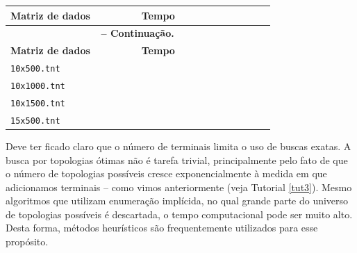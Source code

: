 \begin{refsection}
\begin{center}
\begin{longtable}{lcccccc}
\hline\hline \textbf{Matriz de dados} & \textbf{Tempo}\\
\endfirsthead

\multicolumn{6}{c}{{\bfseries \tablename\ \thetable{} -- Continuação.}}\\
\hline\hline \textbf{Matriz de dados} & \textbf{Tempo}\\
\endhead
\hline \hline
\endlastfoot
\hline
\texttt{10x500.tnt} & ~~~~~~~~~~~~~~~~~~~~~~~~\\
\texttt{10x1000.tnt} & ~~~~~~~~~~~~~~~~~~~~~~~~\\
\texttt{10x1500.tnt} & ~~~~~~~~~~~~~~~~~~~~~~~~\\
\texttt{15x500.tnt} & ~~~~~~~~~~~~~~~~~~~~~~~~\\

\end{longtable}
\end{center}



Deve ter ficado claro que o número de terminais limita o uso de buscas exatas. A busca por topologias ótimas não é tarefa trivial, principalmente pelo fato de que o número de topologias possíveis cresce exponencialmente à medida em que adicionamos terminais -- como vimos anteriormente (veja Tutorial \ref{tut3}). Mesmo algoritmos que utilizam enumeração implícida, no qual grande parte do universo de topologias possíveis é descartada, o tempo computacional pode ser muito alto. Desta forma, métodos heurísticos são frequentemente utilizados para esse propósito.


\end{refsection}
